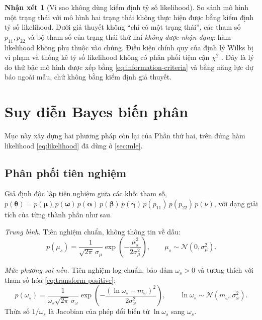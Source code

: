 \documentclass[12pt,a4paper]{article}
\numberwithin{equation}{section}
\theoremstyle{definition}
\newtheorem{remark}{Nhận xét}[section]
\newcommand{\Param}{\symbf{\theta}}
\newcommand{\bmgamma}{\symbf{\gamma}}
\begin{document}
\begin{remark}[Vì sao không dùng kiểm định tỷ số likelihood]\label{rem:lr-test}
So sánh mô hình một trạng thái với mô hình hai trạng thái không thực hiện được bằng kiểm
định tỷ số likelihood. Dưới giả thuyết không ``chỉ có một trạng thái'', các tham số
$p_{11},p_{22}$ và bộ tham số của trạng thái thứ hai \emph{không được nhận dạng}: hàm
likelihood không phụ thuộc vào chúng. Điều kiện chính quy của định lý Wilks bị vi phạm và
thống kê tỷ số likelihood không có phân phối tiệm cận $\chi^{2}$
\cite{davies1987,hansen1992}. Đây là lý do thứ bậc mô hình được xếp bằng
\eqref{eq:information-criteria} và bằng năng lực dự báo ngoài mẫu, chứ không bằng kiểm
định giả thuyết.
\end{remark}

\section{Suy diễn Bayes biến phân}\label{sec:vb}

Mục này xây dựng hai phương pháp còn lại của Phần thứ hai, trên đúng hàm likelihood
\eqref{eq:likelihood} đã dùng ở \cref{sec:mle}.

\subsection{Phân phối tiên nghiệm}\label{subsec:priors}
Giả định độc lập tiên nghiệm giữa các khối tham số,
$p(\Param)=p(\symbf\mu)\,p(\symbf\omega)\,p(\symbf\alpha)\,p(\symbf\beta)\,p(\bmgamma)\,p(p_{11})\,p(p_{22})\,p(\nu)$,
với dạng giải tích của từng thành phần như sau.

\emph{Trung bình.} Tiên nghiệm chuẩn, không thông tin về dấu:
\begin{equation}
  p(\mu_s)=\frac{1}{\sqrt{2\pi}\,\sigma_\mu}
  \exp\!\left(-\frac{\mu_s^{2}}{2\sigma_\mu^{2}}\right),
  \qquad \mu_s\sim\mathcal{N}\!\left(0,\sigma_\mu^{2}\right).
  \label{eq:prior-mu}
\end{equation}

\emph{Mức phương sai nền.} Tiên nghiệm log-chuẩn, bảo đảm $\omega_s>0$ và tương thích với
tham số hóa \eqref{eq:transform-positive}:
\begin{equation}
  p(\omega_s)=\frac{1}{\omega_s\sqrt{2\pi}\,\sigma_\omega}
  \exp\!\left(-\frac{\left(\ln\omega_s-m_\omega\right)^{2}}{2\sigma_\omega^{2}}\right),
  \qquad \ln\omega_s\sim\mathcal{N}\!\left(m_\omega,\sigma_\omega^{2}\right).
  \label{eq:prior-omega}
\end{equation}
Thừa số $1/\omega_s$ là Jacobian của phép đổi biến từ $\ln\omega_s$ sang $\omega_s$.
\end{document}
